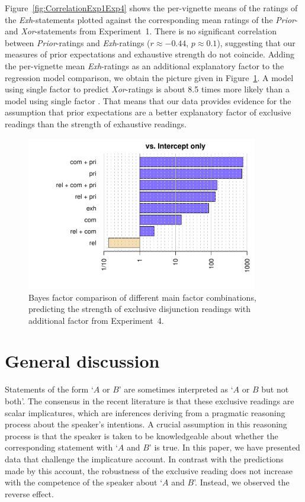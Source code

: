 \documentclass[12pt]{article}
\begin{document}
Figure~\ref{fig:CorrelationExp1Exp4} shows the per-vignette means of the ratings of the
\emph{Exh}-statements plotted against the corresponding mean ratings of the \emph{Prior}- and
\emph{Xor}-statements from Experiment~1. There is no significant correlation between
\emph{Prior}-ratings and \emph{Exh}-ratings ($r \approx -0.44$, $p \approx 0.1$), suggesting
that our measures of prior expectations and exhaustive strength do not coincide. Adding the
per-vignette mean \emph{Exh}-ratings as an additional explanatory factor \exh to the regression
model comparison, we obtain the picture given in Figure~\ref{fig:BayesFactorsExp4}. A model
using single factor \pri to predict \emph{Xor}-ratings is about 8.5 times more likely than a
model using single factor \exh. That means that our data provides evidence for the assumption
that prior expectations are a better explanatory factor of exclusive readings than the strength
of exhaustive readings.

\begin{figure}
  \centering
  \includegraphics[width=0.9\textwidth]{pics/bfsAllExp4.pdf}
  \caption{Bayes factor comparison of different main factor combinations, predicting the
    strength of exclusive disjunction readings with additional factor \exh from Experiment~4.}
\label{fig:BayesFactorsExp4}
\end{figure}

\section{General discussion}

Statements of the form `$A$ or $B$' are sometimes interpreted as `$A$ or $B$ but not both'. The consensus in the recent literature is that these exclusive readings are scalar implicatures, which are inferences deriving from a pragmatic reasoning process about the speaker's intentions. A crucial assumption in this reasoning process is that the speaker is taken to be knowledgeable about whether the corresponding statement with `$A$ and $B$' is true. In this paper, we have presented data that challenge the implicature account. In contrast with the predictions made by this account, the robustness of the exclusive reading does not increase with the competence of the speaker about `$A$ and $B$'. Instead, we observed the reverse effect.
\end{document}
